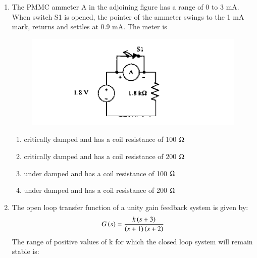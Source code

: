 \documentclass[journal,12pt,onecolumn]{IEEEtran}
\theoremstyle{remark}
\begin{document}
\begin{enumerate}
\hfill{}
\begin{enumerate}
\end{enumerate}

\item  The PMMC ammeter A in the adjoining figure has a range of 0 to 3 mA. When switch S1 is opened, the pointer of the ammeter swings to the 1 mA mark, returns and settles at 0.9 mA. The meter is
\begin{figure}[H]
    \centering
    \includegraphics[width = 0.7\columnwidth]{q11}
    \caption*{}
    \label{fig:Q11}
\end{figure}

\hfill{}
\begin{enumerate}
\item  critically damped and has a coil resistance of 100 $\ohm$
\item critically damped and has a coil resistance of 200 $\ohm$
\item under damped and has a coil resistance of 100 $\ohm$
\item under damped and has a coil resistance of 200 $\ohm$
\end{enumerate}

\item The open loop transfer function of a unity gain feedback system is given by: 
\begin{align*}
G\left(s\right) = \frac{k\left(s+3\right)}{\left(s+1\right)\left(s+2\right)}
\end{align*}
The range of positive values of k for which the closed loop system will remain stable is:

\hfill{}
\begin{enumerate}
\end{enumerate}


\end{enumerate}
\end{document}
